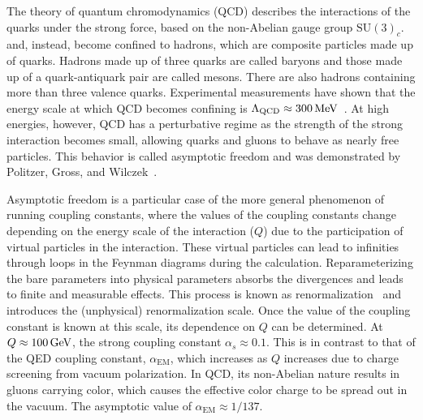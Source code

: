 The theory of quantum chromodynamics (QCD) describes the interactions of the quarks under the strong force, based on the non-Abelian gauge group $\mathrm{SU}(3)_c$.  and, instead, become confined to hadrons, which are composite particles made up of quarks. Hadrons made up of three quarks are called baryons and those made up of a quark-antiquark pair are called mesons. There are also hadrons containing more than three valence quarks. Experimental measurements have shown that the energy scale at which QCD becomes confining is $\Lambda_{\mathrm{QCD}} \approx 300\,\text{Me\hspace{-.08em}V}$~\cite{Halzen:1984mc,Tanabashi:2018oca}. At high energies, however, QCD has a perturbative regime as the strength of the strong interaction becomes small, allowing quarks and gluons to behave as nearly free particles. This behavior is called asymptotic freedom and was demonstrated by Politzer, Gross, and Wilczek~\cite{Gross:1973id,Politzer:1973fx}.

Asymptotic freedom is a particular case of the more general phenomenon of running coupling constants, where the values of the coupling constants change depending on the energy scale of the interaction ($Q$) due to the participation of virtual particles in the interaction. These virtual particles can lead to infinities through loops in the Feynman diagrams during the calculation. Reparameterizing the bare parameters into physical parameters absorbs the divergences and leads to finite and measurable effects. This process is known as renormalization~\cite{tHooft:1972tcz} and introduces the (unphysical) renormalization scale. Once the value of the coupling constant is known at this scale, its dependence on $Q$ can be determined. At $Q \approx 100\,\text{Ge\hspace{-.08em}V}$, the strong coupling constant $\alpha_s \approx 0.1$. This is in contrast to that of the QED coupling constant, $\alpha_{\mathrm{EM}}$, which increases as $Q$ increases due to charge screening from vacuum polarization. In QCD, its non-Abelian nature results in gluons carrying color, which causes the effective color charge to be spread out in the vacuum. The asymptotic value of $\alpha_{\mathrm{EM}} \approx 1/137$.

